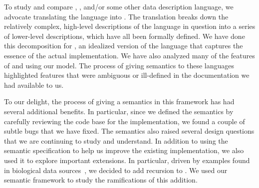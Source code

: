 To study and compare \pads{}, \datascript{}, and/or
some other data description language, we advocate translating
the language into \ddc{}.  The translation breaks down
the relatively complex, high-level descriptions of the language 
in question into a series of lower-level
\ddc{} descriptions, which have all been formally defined.  
We have done this decomposition for \ipads{}, an idealized version of the
\pads{} language that captures the essence of the actual 
implementation.  We have also analyzed many of the features of
\packettypes{} and \datascript{} using our model.  The process of
giving semantics to these languages
highlighted features that were ambiguous or 
ill-defined in the documentation we had available to us.

To our delight, the process of giving \pads{} 
a semantics in this framework has had several additional benefits.  
In particular, since we defined the
semantics by carefully reviewing the code base for the 
implementation, we found a couple of subtle bugs that we 
have fixed.  The semantics also raised several
design questions that we are continuing to study and understand. 
In addition to using the semantic specification to help us improve the
existing implementation, we also used it to explore important extensions.
In particular, driven by examples found in biological data 
sources~\cite{geneontology,newick}, we decided to add recursion to \pads{}.
We used our semantic framework to study the ramifications of this addition.

